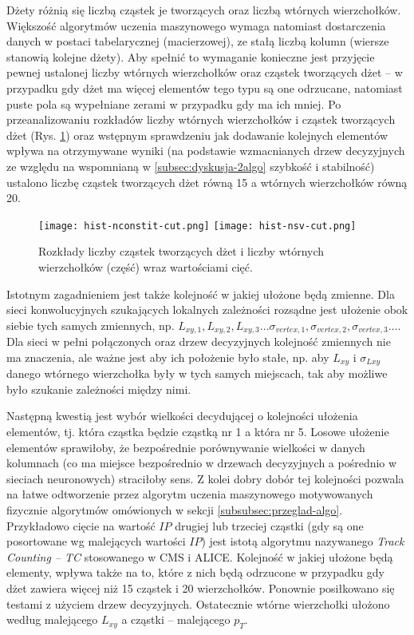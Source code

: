 Dżety różnią się liczbą cząstek je tworzących oraz liczbą wtórnych wierzchołków. Większość algorytmów uczenia maszynowego wymaga natomiast dostarczenia danych w postaci tabelarycznej (macierzowej), ze stałą liczbą kolumn (wiersze stanowią kolejne dżety). Aby spełnić to wymaganie konieczne jest przyjęcie pewnej ustalonej liczby wtórnych wierzchołków oraz cząstek tworzących dżet -- w przypadku gdy dżet ma więcej elementów tego typu są one odrzucane, natomiast puste pola są wypełniane zerami w przypadku gdy ma ich mniej. 
Po przeanalizowaniu rozkładów liczby wtórnych wierzchołków i cząstek tworzących dżet (Rys. \ref{fig:nsv_nconstit_distr}) oraz wstępnym sprawdzeniu jak dodawanie kolejnych elementów wpływa na otrzymywane wyniki (na podstawie wzmacnianych drzew decyzyjnych ze względu na wspomnianą w \ref{subsec:dyskusja-2algo} szybkość i stabilność) ustalono liczbę cząstek tworzących dżet równą 15 a wtórnych wierzchołków równą 20.

\begin{figure}[h]
	\centering
	\texttt{[image: hist-nconstit-cut.png]}
	\texttt{[image: hist-nsv-cut.png]}
	\caption{Rozkłady liczby cząstek tworzących dżet i liczby wtórnych wierzchołków (część) wraz wartościami cięć.}
	\label{fig:nsv_nconstit_distr}
\end{figure}

Istotnym zagadnieniem jest także kolejność w jakiej ułożone będą zmienne. 
Dla sieci konwolucyjnych szukających lokalnych zależności rozsądne jest ułożenie obok siebie tych samych zmiennych, np. $L_{xy,1}, L_{xy,2}, L_{xy,3} \dots \sigma_{vertex,1}, \sigma_{vertex,2}, \sigma_{vertex,3} \dots$. 
Dla sieci w pełni połączonych oraz drzew decyzyjnych kolejność zmiennych nie ma znaczenia, ale ważne jest aby ich położenie było stałe, np. aby $L_{xy}$ i $\sigma_{Lxy}$ danego wtórnego wierzchołka były w tych samych miejscach, tak aby możliwe było szukanie zależności między nimi.

Następną kwestią jest wybór wielkości decydującej o kolejności ułożenia elementów, tj. która cząstka będzie cząstką nr 1 a która nr 5. Losowe ułożenie elementów sprawiłoby, że bezpośrednie porównywanie wielkości w danych kolumnach (co ma miejsce bezpośrednio w drzewach decyzyjnych a pośrednio w sieciach neuronowych) straciłoby sens. Z kolei dobry dobór tej kolejności pozwala na łatwe odtworzenie przez algorytm uczenia maszynowego motywowanych fizycznie algorytmów omówionych w sekcji \ref{subsubsec:przeglad-algo}. Przykładowo cięcie na wartość $IP$ drugiej lub trzeciej cząstki (gdy są one posortowane wg malejących wartości $IP$) jest istotą algorytmu nazywanego \textit{Track Counting -- TC} stosowanego w CMS i ALICE.
Kolejność w jakiej ułożone będą elementy, wpływa także na to, które z nich będą odrzucone w przypadku gdy dżet zawiera więcej niż 15 cząstek i 20 wierzchołków. 
Ponownie posiłkowano się testami z użyciem drzew decyzyjnych. Ostatecznie wtórne wierzchołki ułożono według malejącego $L_{xy}$ a cząstki -- malejącego $p_T$.


